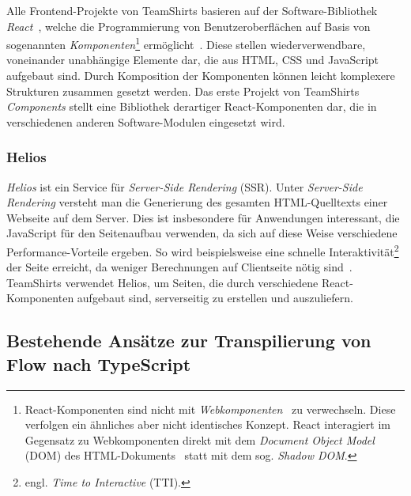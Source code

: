 Alle Frontend-Projekte von TeamShirts basieren auf der Software-Bibliothek \textit{React}~\autocite{SOFTWARE:REACT}, welche die Programmierung von Benutzeroberflächen auf Basis von sogenannten \emph{Komponenten}\footnote{React-Komponenten sind nicht mit \textit{Webkomponenten}~\autocite{MDN:WEBCOMPONENTS} zu verwechseln. Diese verfolgen ein ähnliches aber nicht identisches Konzept. React interagiert im Gegensatz zu Webkomponenten direkt mit dem \textit{Document Object Model} (DOM) des HTML-Dokuments~\autocite{REACT:WEBCOMPONENTS} statt mit dem sog. \textit{Shadow DOM}.} ermöglicht~\autocite{ACM:REACT}. Diese stellen wiederverwendbare, voneinander unabhängige Elemente dar, die aus HTML, CSS und JavaScript aufgebaut sind. Durch Komposition der Komponenten können leicht komplexere Strukturen zusammen gesetzt werden. Das erste Projekt von TeamShirts \textit{Components} stellt eine Bibliothek derartiger React-Komponenten dar, die in verschiedenen anderen Software-Modulen eingesetzt wird.

\subsubsection{Helios}

\textit{Helios} ist ein Service für \emph{Server-Side Rendering} (SSR). Unter \emph{Server-Side Rendering} versteht man die Generierung des gesamten HTML-Quelltexts einer Webseite auf dem Server. Dies ist insbesondere für Anwendungen interessant, die JavaScript für den Seitenaufbau verwenden, da sich auf diese Weise verschiedene Performance-Vorteile ergeben. So wird beispielsweise eine schnelle Interaktivität\footnote{engl. \emph{Time to Interactive} (TTI).} der Seite erreicht, da weniger Berechnungen auf Clientseite nötig sind~\autocite{GOOGLE:RENDERING_ON_THE_WEB}. TeamShirts verwendet Helios, um Seiten, die durch verschiedene React-Komponenten aufgebaut sind, serverseitig zu erstellen und auszuliefern.

\subsection{Bestehende Ansätze zur Transpilierung von Flow nach TypeScript}

